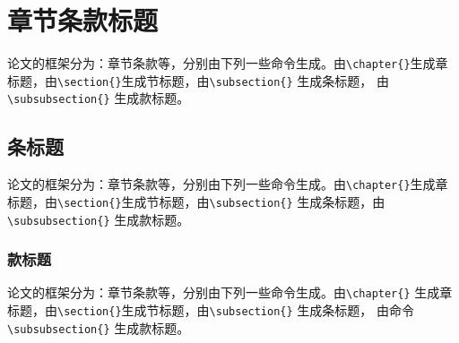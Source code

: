 \section{章节条款标题}\label{section1-3}
论文的框架分为：章节条款等，分别由下列一些命令生成。由\verb|\chapter{}|生成章标题，由\verb|\section{}|生成节标题，由\verb|\subsection{}| 生成条标题，   由 \verb|\subsubsection{}| 生成款标题。

\subsection{条标题}\label{section1-3-1}
论文的框架分为：章节条款等，分别由下列一些命令生成。由\verb|\chapter{}|生成章标题，由\verb|\section{}|生成节标题，由\verb|\subsection{}| 生成条标题，由 \verb|\subsubsection{}| 生成款标题。

\subsubsection{款标题}\label{section1-3-1-1}
\quad 论文的框架分为：章节条款等，分别由下列一些命令生成。由\verb|\chapter{}| 生成章标题，由\verb|\section{}|生成节标题，由\verb|\subsection{}| 生成条标题， 由命令\verb|\subsubsection{}| 生成款标题。

